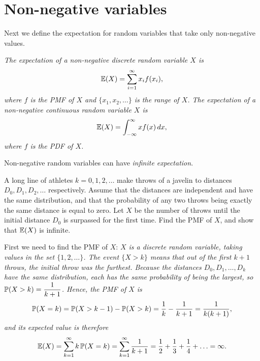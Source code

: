 
\section{Non-negative variables}\label{sec:expe}

Next we define the expectation for random variables that take only non-negative values. 

\begin{definition}\label{def:expe_non-negative}
\ben
\it 
The expectation of a non-negative \emph{discrete} random variable $X$ is
\[
\mathbb{E}(X) = \sum_{i=1}^{\infty} x_i f(x_i),
\]
where $f$ is the PMF of $X$ and $\{x_1,x_2,\ldots\}$ is the range of $X$.
\it 
The expectation of a non-negative \emph{continuous} random variable $X$ is
\[
\mathbb{E}(X) = \int_{-\infty}^{\infty} xf(x)\,dx,
\]
where $f$ is the PDF of $X$.
\een
\end{definition}

Non-negative random variables can have \emph{infinite expectation}.

\begin{example} %
A long line of athletes $k=0,1,2,\ldots$ make throws of a javelin to distances $D_0,D_1,D_2,\ldots$ respectively. Assume that the distances are independent and have the same distribution, and that the probability of any two throws being exactly the same distance is equal to zero. Let $X$ be the number of throws until the initial distance $D_0$ is surpassed for the first time. Find the PMF of $X$, and show that $\mathbb{E}(X)$ is infinite.
\begin{solution}
First we need to find the PMF of $X$:
\bit
\it $X$ is a discrete random variable, taking values in the set $\{1,2,\ldots\}$.
\it The event $\{X>k\}$ means that out of the first $k+1$ throws, the initial throw was the furthest.
\it Because the distances $D_0,D_1,\ldots,D_k$ have the same distribution, each has the same probability of being the largest, so $\displaystyle\mathbb{P}(X>k)=\frac{1}{k+1}$.
\eit
Hence, the PMF of $X$ is 
\[
\mathbb{P}(X=k) = \mathbb{P}(X>k-1) - \mathbb{P}(X>k) = \frac{1}{k} - \frac{1}{k+1} = \frac{1}{k(k+1)},
\]
and its expected value is therefore
\[
\mathbb{E}(X)
	= \sum_{k=1}^\infty k\,\mathbb{P}(X=k)
	= \sum_{k=1}^\infty \frac{1}{k+1} 
	= \frac{1}{2} + \frac{1}{3} + \frac{1}{4} + \ldots
	= \infty.
\]
\end{solution}
\end{example}

